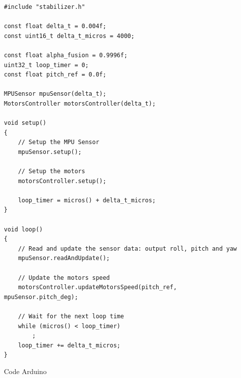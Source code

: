 \begin{listing}[!htpb]
	\begin{verbatim}
#include "stabilizer.h"

const float delta_t = 0.004f;
const uint16_t delta_t_micros = 4000;

const float alpha_fusion = 0.9996f;
uint32_t loop_timer = 0;
const float pitch_ref = 0.0f;

MPUSensor mpuSensor(delta_t);
MotorsController motorsController(delta_t);

void setup()
{
	// Setup the MPU Sensor
	mpuSensor.setup();

	// Setup the motors
	motorsController.setup();

	loop_timer = micros() + delta_t_micros;
}

void loop()
{
	// Read and update the sensor data: output roll, pitch and yaw
	mpuSensor.readAndUpdate();

	// Update the motors speed
	motorsController.updateMotorsSpeed(pitch_ref, mpuSensor.pitch_deg);

	// Wait for the next loop time
	while (micros() < loop_timer)
		;
	loop_timer += delta_t_micros;
}

	\end{verbatim}
	\caption{Code Arduino}
	\label{listing:arduino-code}
\end{listing}
